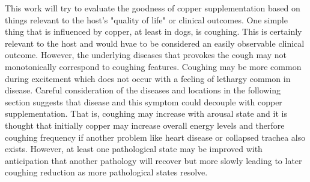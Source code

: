 {This work will try to evaluate the goodness of copper supplementation
based on things relevant to the host's  "quality of life"
or clinical outcomes.
One simple thing that is influenced by  copper, at least in dogs,
 is coughing.
This is certainly relevant to the host and would hvae to be considered
an easily observable clinical outcome. 
However, the underlying diseases that provokes the
cough may not monotonically correspond to coughing features.  
Coughing may be more common during excitement which does not
occur with a feeling of lethargy common in disease.
Careful consideration of the diseases and locations in the following
section
suggests that disease and this symptom
could decouple with copper supplementation. That is, coughing may 
increase with  arousal state
and it is thought that initially  copper may increase overall 
energy levels and therfore  coughing frequency if another problem
like heart disease or collapsed trachea also exists.
However, at least one pathological state
may be improved with anticipation that another pathology will
recover but more slowly leading to later coughing reduction as more
pathological states resolve. 

} %


